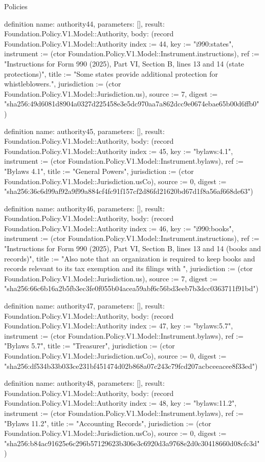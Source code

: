 \begin{lexlean}{Policies}
\begin{semanticmodule}
definition{
  name: authority44,
  parameters: [],
  result: Foundation.Policy.V1.Model::Authority,
  body: (record Foundation.Policy.V1.Model::Authority {index := 44, key := "i990:states", instrument := (ctor Foundation.Policy.V1.Model::Instrument.instructions), ref := "Instructions for Form 990 (2025), Part VI, Section B, lines 13 and 14 (state protections)", title := "Some states provide additional protection for whistleblowers.", jurisdiction := (ctor Foundation.Policy.V1.Model::Jurisdiction.us), source := 7, digest := "sha256:49d6081d8904a0327d225458e3e5dc970aa7a862dcc9e0674ebae65b00d6ffb0"})
}

definition{
  name: authority45,
  parameters: [],
  result: Foundation.Policy.V1.Model::Authority,
  body: (record Foundation.Policy.V1.Model::Authority {index := 45, key := "bylaws:4.1", instrument := (ctor Foundation.Policy.V1.Model::Instrument.bylaws), ref := "Bylaws 4.1", title := "General Powers", jurisdiction := (ctor Foundation.Policy.V1.Model::Jurisdiction.usCo), source := 0, digest := "sha256:36c6d99af92a9f99a884cf4fc91f157cf2d86fd21620bd67d1f8a56af668de63"})
}

definition{
  name: authority46,
  parameters: [],
  result: Foundation.Policy.V1.Model::Authority,
  body: (record Foundation.Policy.V1.Model::Authority {index := 46, key := "i990:books", instrument := (ctor Foundation.Policy.V1.Model::Instrument.instructions), ref := "Instructions for Form 990 (2025), Part VI, Section B, lines 13 and 14 (books and records)", title := "Also note that an organization is required to keep books and records relevant to its tax exemption and its filings with ", jurisdiction := (ctor Foundation.Policy.V1.Model::Jurisdiction.us), source := 7, digest := "sha256:66c6b16a2b5fb3ec3fe0f055b04acea59abf6c56bd3eeb7b3dcc0363711f91bd"})
}

definition{
  name: authority47,
  parameters: [],
  result: Foundation.Policy.V1.Model::Authority,
  body: (record Foundation.Policy.V1.Model::Authority {index := 47, key := "bylaws:5.7", instrument := (ctor Foundation.Policy.V1.Model::Instrument.bylaws), ref := "Bylaws 5.7", title := "Treasurer", jurisdiction := (ctor Foundation.Policy.V1.Model::Jurisdiction.usCo), source := 0, digest := "sha256:df534b33b033ce231bf451474d02b868a07c243c79fcd207acbceeacee8f33ed"})
}

definition{
  name: authority48,
  parameters: [],
  result: Foundation.Policy.V1.Model::Authority,
  body: (record Foundation.Policy.V1.Model::Authority {index := 48, key := "bylaws:11.2", instrument := (ctor Foundation.Policy.V1.Model::Instrument.bylaws), ref := "Bylaws 11.2", title := "Accounting Records", jurisdiction := (ctor Foundation.Policy.V1.Model::Jurisdiction.usCo), source := 0, digest := "sha256:b84ac91625e6c296b57129623b306e3c6920d3a9768e2d0c30418660d08cfc3d"})
}


\end{semanticmodule}
\end{lexlean}
